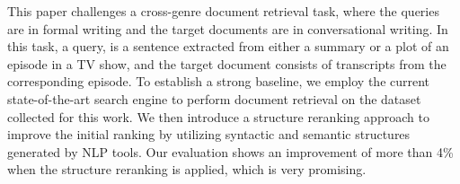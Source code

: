 This paper challenges a cross-genre document retrieval task, where the queries are in formal writing and the target documents are in conversational writing. In this task, a query, is a sentence extracted from either a summary or a plot of an episode in a TV show, and the target document consists of transcripts from the corresponding episode. To establish a strong baseline, we employ the current state-of-the-art search engine to perform document retrieval on the dataset collected for this work. We then introduce a structure reranking approach to improve the initial ranking by utilizing syntactic and semantic structures generated by NLP tools. Our evaluation shows an improvement of more than 4\% when the structure reranking is applied, which is very promising.
